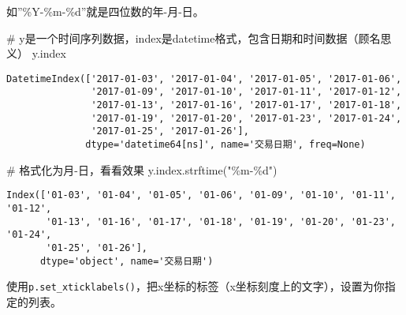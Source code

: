 \documentclass[
  letterpaper,
  DIV=11,
  numbers=noendperiod]{scrreprt}
\newenvironment{Shaded}{\begin{snugshade}}{\end{snugshade}}
\newcommand{\CommentTok}[1]{\textcolor[rgb]{0.37,0.37,0.37}{#1}}
\newcommand{\NormalTok}[1]{\textcolor[rgb]{0.00,0.23,0.31}{#1}}
\newcommand{\SpecialCharTok}[1]{\textcolor[rgb]{0.37,0.37,0.37}{#1}}
\newcommand{\StringTok}[1]{\textcolor[rgb]{0.13,0.47,0.30}{#1}}
\begin{document}
如''\%Y-\%m-\%d''就是四位数的年-月-日。

\begin{Shaded}
\begin{Highlighting}[]
\CommentTok{\# y是一个时间序列数据，index是datetime格式，包含日期和时间数据（顾名思义）}
\NormalTok{y.index}
\end{Highlighting}
\end{Shaded}

\begin{verbatim}
DatetimeIndex(['2017-01-03', '2017-01-04', '2017-01-05', '2017-01-06',
               '2017-01-09', '2017-01-10', '2017-01-11', '2017-01-12',
               '2017-01-13', '2017-01-16', '2017-01-17', '2017-01-18',
               '2017-01-19', '2017-01-20', '2017-01-23', '2017-01-24',
               '2017-01-25', '2017-01-26'],
              dtype='datetime64[ns]', name='交易日期', freq=None)
\end{verbatim}

\begin{Shaded}
\begin{Highlighting}[]
\CommentTok{\# 格式化为\textquotesingle{}月{-}日\textquotesingle{}，看看效果}
\NormalTok{y.index.strftime(}\StringTok{"\%m{-}}\SpecialCharTok{\%d}\StringTok{"}\NormalTok{)}
\end{Highlighting}
\end{Shaded}

\begin{verbatim}
Index(['01-03', '01-04', '01-05', '01-06', '01-09', '01-10', '01-11', '01-12',
       '01-13', '01-16', '01-17', '01-18', '01-19', '01-20', '01-23', '01-24',
       '01-25', '01-26'],
      dtype='object', name='交易日期')
\end{verbatim}

使用\texttt{p.set\_xticklabels()}，把x坐标的标签（x坐标刻度上的文字），设置为你指定的列表。
\end{document}
